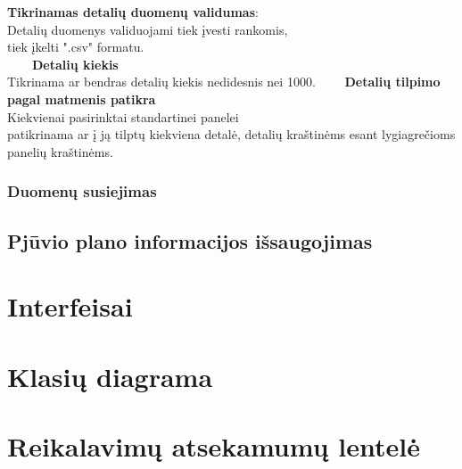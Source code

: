 \documentclass[a4paper,12pt]{article}
\newcommand{\tabitem}{~~\llap{\textbullet}~~}
\begin{document}
\textbf{Tikrinamas detalių duomenų validumas}:\\
Detalių duomenys validuojami tiek įvesti rankomis, \\
tiek įkelti ".csv" formatu.\\
\tabitem \textbf{Detalių kiekis} \\
Tikrinama ar bendras detalių kiekis nedidesnis nei 1000.
\tabitem \textbf{Detalių tilpimo pagal matmenis patikra} \\
Kiekvienai pasirinktai standartinei panelei \\
patikrinama ar į ją tilptų kiekviena detalė,
detalių kraštinėms esant lygiagrečioms panelių kraštinėms.



% 


\subsubsection{Duomenų susiejimas}





\subsection{ Pjūvio plano informacijos išsaugojimas }



\section{Interfeisai}


\section{Klasių diagrama}


\section{Reikalavimų atsekamumų lentelė}
\end{document}
